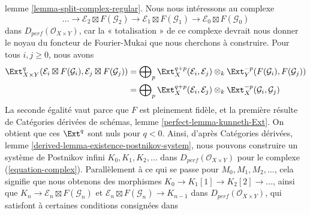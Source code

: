 lemme \ref{lemma-split-complex-regular}.
\medskip\noindent
Nous nous intéressons au complexe
\begin{equation}
\label{equation-complex}
\ldots \to
\mathcal{E}_2 \boxtimes F(\mathcal{G}_2) \to
\mathcal{E}_1 \boxtimes F(\mathcal{G}_1) \to
\mathcal{E}_0 \boxtimes F(\mathcal{G}_0)
\end{equation}
dans $D_{perf}(\mathcal{O}_{X \times Y})$,
car la « totalisation » de ce complexe devrait
nous donner le noyau du foncteur de Fourier-Mukai que nous cherchons à construire.
Pour tous $i, j \geq 0$, nous avons
\begin{align*}
\Ext^q_{X \times Y}(\mathcal{E}_i \boxtimes F(\mathcal{G}_i),
\mathcal{E}_j \boxtimes F(\mathcal{G}_j))
& =
\bigoplus\nolimits_p
\Ext^{q + p}_X(\mathcal{E}_i, \mathcal{E}_j) \otimes_k
\Ext^{-p}_Y(F(\mathcal{G}_i), F(\mathcal{G}_j)) \\
& =
\bigoplus\nolimits_p
\Ext^{q + p}_X(\mathcal{E}_i, \mathcal{E}_j) \otimes_k
\Ext^{-p}_X(\mathcal{G}_i, \mathcal{G}_j)
\end{align*}
La seconde égalité vaut parce que $F$ est pleinement fidèle, et la première
résulte de Catégories dérivées de schémas, lemme
\ref{perfect-lemma-kunneth-Ext}.
On obtient que ces $\Ext^q$ sont nuls pour $q < 0$.
Ainsi, d'après Catégories dérivées, lemme
\ref{derived-lemma-existence-postnikov-system},
nous pouvons construire un système de Postnikov infini $K_0, K_1, K_2, \ldots$
dans $D_{perf}(\mathcal{O}_{X \times Y})$ pour le complexe
(\ref{equation-complex}).
Parallèlement à ce qui se passe pour $M_0, M_1, M_2, \ldots$, cela signifie
que nous obtenons des morphismes
$K_0 \to K_1[1] \to K_2[2] \to \ldots$, ainsi que
$K_n \to \mathcal{E}_n \boxtimes F(\mathcal{G}_n)$ et
$\mathcal{E}_n \boxtimes F(\mathcal{G}_n) \to K_{n - 1}$
dans $D_{perf}(\mathcal{O}_{X \times Y})$,
qui satisfont à certaines conditions consignées dans

